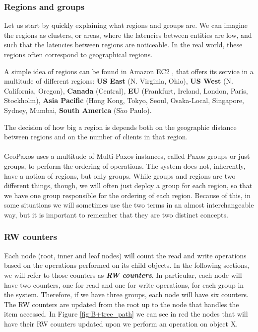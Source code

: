 \subsubsection{Regions and groups}
Let us start by quickly explaining what regions and groups are. We can imagine the regions as clusters, or areas, where the latencies between entities are low, and such that the latencies between regions are noticeable. In the real world, these regions often correspond to geographical regions.

A simple idea of regions can be found in Amazon EC2 \citep{amazonEC2}, that offers its service in a multitude of different regions: \textbf{US East} (N. Virginia, Ohio), \textbf{US West} (N. California, Oregon), \textbf{Canada} (Central), \textbf{EU} (Frankfurt, Ireland, London, Paris, Stockholm), \textbf{Asia Pacific} (Hong Kong, Tokyo, Seoul, Osaka-Local, Singapore, Sydney, Mumbai, \textbf{South America} (S$\tilde{a}$o Paulo).

The decision of how big a region is depends both on the geographic distance between regions and on the number of clients in that region.\\\\
GeoPaxos uses a multitude of Multi-Paxos instances, called Paxos groups or just groups, to perform the ordering of operations. The system does not, inherently, have a notion of regions, but only groups. While groups and regions are two different things, though, we will often just deploy a group for each region, so that we have one group responsible for the ordering of each region. Because of this, in some situations we will sometimes use the two terms in an almost interchangeable way, but it is important to remember that they are two distinct concepts.

\subsubsection{RW counters}
Each node (root, inner and leaf nodes) will count the read and write operations based on the operations performed on its child objects. In the following sections, we will refer to those counters as \textbf{\emph{RW counters}}. In particular, each node will have two counters, one for read and one for write operations, for each group in the system. Therefore, if we have three groups, each node will have six counters. The RW counters are updated from the root up to the node that handles the item accessed. In Figure \ref{fig:B+tree_path} we can see in red the nodes that will have their RW counters updated upon we perform an operation on object X. 

